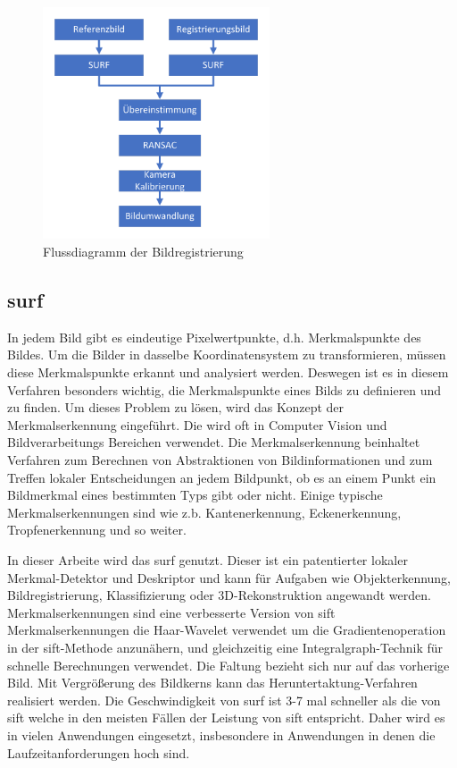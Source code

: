 \begin{figure}[H]
 \centering 
 \includegraphics[keepaspectratio,width=0.6\textwidth]{images/3_Ersteverfahren/Bildregistration.pdf}
 \caption{Flussdiagramm der Bildregistrierung}
 \label{fig:Bildregistrierung}
\end{figure}

\subsection{\gls{surf}}
In jedem Bild gibt es eindeutige Pixelwertpunkte, d.h. Merkmalspunkte des Bildes. Um die Bilder in dasselbe Koordinatensystem zu transformieren, müssen diese Merkmalspunkte erkannt und analysiert werden. Deswegen ist es in diesem Verfahren besonders wichtig, die Merkmalspunkte eines Bilds zu definieren und zu finden. Um dieses Problem zu lösen, wird das Konzept der Merkmalserkennung eingeführt. Die wird oft in Computer Vision und Bildverarbeitungs Bereichen verwendet. Die Merkmalserkennung beinhaltet Verfahren zum Berechnen von Abstraktionen von Bildinformationen und zum Treffen lokaler Entscheidungen an jedem Bildpunkt, ob es an einem Punkt ein Bildmerkmal eines bestimmten Typs gibt oder nicht. Einige typische Merkmalserkennungen sind wie z.b. Kantenerkennung, Eckenerkennung, Tropfenerkennung und so weiter.

In dieser Arbeite wird das \gls{surf} \cite{Surf} genutzt. 
Dieser ist ein patentierter lokaler Merkmal-Detektor und Deskriptor und kann für Aufgaben wie Objekterkennung, Bildregistrierung, Klassifizierung oder 3D-Rekonstruktion angewandt werden. Merkmalserkennungen sind eine verbesserte Version von \gls{sift} Merkmalserkennungen die Haar-Wavelet verwendet um die Gradientenoperation in der \gls{sift}-Methode anzunähern, und gleichzeitig eine Integralgraph-Technik für schnelle Berechnungen verwendet. Die Faltung bezieht sich nur auf das vorherige Bild. Mit Vergrößerung des Bildkerns kann das Heruntertaktung-Verfahren realisiert werden. Die Geschwindigkeit von \gls{surf} ist 3-7 mal schneller als die von \gls{sift} welche in den meisten Fällen der Leistung von \gls{sift} entspricht. Daher wird es in vielen Anwendungen eingesetzt, insbesondere in Anwendungen in denen die Laufzeitanforderungen hoch sind. 


